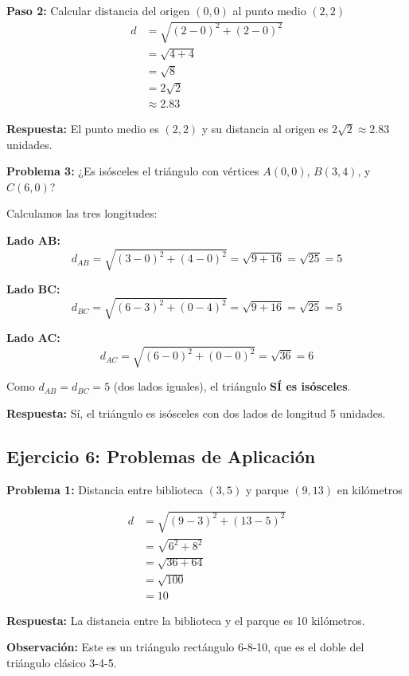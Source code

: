 \textbf{Paso 2:} Calcular distancia del origen $(0, 0)$ al punto medio $(2, 2)$
\begin{align*}
d &= \sqrt{(2-0)^2 + (2-0)^2} \\
  &= \sqrt{4 + 4} \\
  &= \sqrt{8} \\
  &= 2\sqrt{2} \\
  &\approx 2.83
\end{align*}

\textbf{Respuesta:} El punto medio es $(2, 2)$ y su distancia al origen es $2\sqrt{2} \approx 2.83$ unidades.

\medskip

\textbf{Problema 3:} ¿Es isósceles el triángulo con vértices $A(0, 0)$, $B(3, 4)$, y $C(6, 0)$?

Calculamos las tres longitudes:

\textbf{Lado AB:}
$$d_{AB} = \sqrt{(3-0)^2 + (4-0)^2} = \sqrt{9 + 16} = \sqrt{25} = 5$$

\textbf{Lado BC:}
$$d_{BC} = \sqrt{(6-3)^2 + (0-4)^2} = \sqrt{9 + 16} = \sqrt{25} = 5$$

\textbf{Lado AC:}
$$d_{AC} = \sqrt{(6-0)^2 + (0-0)^2} = \sqrt{36} = 6$$

Como $d_{AB} = d_{BC} = 5$ (dos lados iguales), el triángulo \textbf{SÍ es isósceles}.

\textbf{Respuesta:} Sí, el triángulo es isósceles con dos lados de longitud 5 unidades.

\newpage

\subsection*{Ejercicio 6: Problemas de Aplicación}

\textbf{Problema 1:} Distancia entre biblioteca $(3, 5)$ y parque $(9, 13)$ en kilómetros

\begin{align*}
d &= \sqrt{(9-3)^2 + (13-5)^2} \\
  &= \sqrt{6^2 + 8^2} \\
  &= \sqrt{36 + 64} \\
  &= \sqrt{100} \\
  &= 10
\end{align*}

\textbf{Respuesta:} La distancia entre la biblioteca y el parque es 10 kilómetros.

\textbf{Observación:} Este es un triángulo rectángulo 6-8-10, que es el doble del triángulo clásico 3-4-5.

